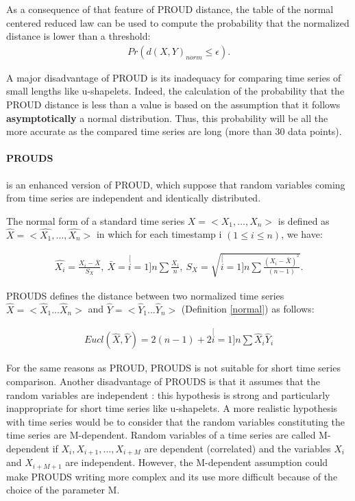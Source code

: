 As a consequence of that feature of PROUD distance,  the table of the normal centered reduced law can be used to compute the probability that the normalized distance is lower than a threshold:
\begin{eqnarray}
Pr(d(X,Y)_{norm}\leq\epsilon).
\end{eqnarray} 

A major disadvantage of PROUD is its inadequacy for comparing time series of small lengths like u-shapelets. Indeed, the calculation of the probability that the PROUD distance is less than a value is based on the assumption that it follows \textbf{asymptotically} a normal distribution.  Thus, this probability will be all the more accurate as the compared time series are long (more than 30 data points).


\paragraph{PROUDS}\cite{Orang2015} is an enhanced version of PROUD, which suppose that random variables coming from time series are independent and
identically distributed. 


\begin{definition}
\label{normal}
The normal form of a standard time series $X = <X_1, \ldots, X_n>$ is defined as
$\hat{X}=<\hat{X_{1}},\ldots,\hat{X_{n}}>$ in which for each timestamp i $(1 \leq i \leq n)$, we have:

\begin{eqnarray}
\hat{X_{i}}=\frac{X_{i}-\bar{X}}{S_{X}},\:\bar{X}=\stackrel[i=1]{n}{\sum}\frac{X_{i}}{n},\:S_{X}=\sqrt{\stackrel[i=1]{n}{\sum}\frac{(X_{i}-\bar{X})^{^{2}}}{(n-1)}}.
\end{eqnarray}
\label{normal}
\end{definition}



PROUDS defines the distance between two normalized time series  $\hat{X}=<\hat{X}_{1}...\hat{X}_{n}>$ and $\hat{Y}=<\hat{Y}_{1}...\hat{Y}_{n}>$ (Definition \ref{normal}) as follows:

\begin{eqnarray}
Eucl(\hat{X},\hat{Y})=2(n-1)+2\stackrel[i=1]{n}{\sum}\hat{X}_{i}\hat{Y}_{i}
\end{eqnarray}

For the same reasons as PROUD, PROUDS is not suitable for short time series comparison. Another disadvantage of PROUDS is that it assumes that the random variables  are independent : this hypothesis is strong and particularly inappropriate for short time series like u-shapelets. A more realistic hypothesis with time series would be to consider that the random variables constituting the time series are M-dependent. Random variables of a time series are called M-dependent
 if $X_{i},X_{i+1},...,X_{i+M}$ are dependent (correlated) and the
variables $X_{i}$ and $X_{i+M+1}$ are independent. However, the M-dependent assumption could make PROUDS writing more complex and its use more difficult because of the choice of the parameter M. 


